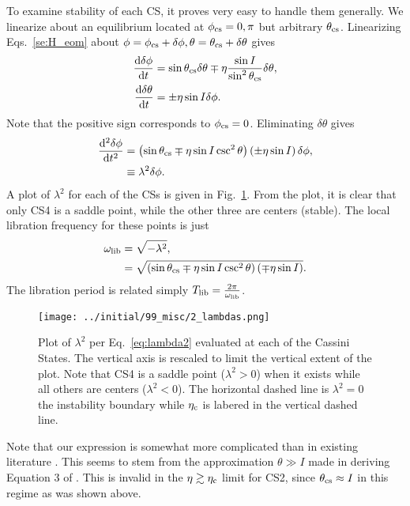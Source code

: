 \documentclass[
        fleqn,
        usenatbib,
        referee,
    ]{mnras}
\newcommand*{\rd}[2]{\frac{\mathrm{d}#1}{\mathrm{d}#2}}
\newcommand*{\rtd}[2]{\frac{\mathrm{d}^2#1}{\mathrm{d}#2^2}}
\newcommand*{\p}[1]{\left(#1\right)}
\begin{document}
To examine stability of each CS, it proves very easy to handle them generally.
We linearize about an equilibrium located at $\phi_{\rm cs} = 0, \pi$ but
arbitrary $\theta_{\rm cs}$. Linearizing Eqs.~\eqref{se:H_eom} about $\phi =
\phi_{\rm cs} + \delta \phi, \theta = \theta_{\rm cs} + \delta \theta$ gives
\begin{subequations}\label{se:H_eom_lin}
    \begin{align}
        \rd{\delta \phi}{t} &= \sin \theta_{\rm cs} \delta \theta
            \mp \eta \frac{\sin I}{\sin^2\theta_{\rm cs}} \delta \theta,\\
        \rd{\delta \theta}{t} &= \pm \eta \sin I \delta \phi.
    \end{align}
\end{subequations}
Note that the positive sign corresponds to $\phi_{\rm cs} = 0$. Eliminating
$\delta \theta$ gives
\begin{align}
    \rtd{\delta \phi}{t} &= \p{\sin \theta_{\rm cs}
        \mp \eta \sin I\csc^2\theta}\p{\pm \eta \sin I} \delta
            \phi,\\
        &\equiv \lambda^2\delta \phi.\label{eq:lambda2}
\end{align}
A plot of $\lambda^2$ for each of the CSs is given in Fig.~\ref{fig:lambda2}.
From the plot, it is clear that only CS4 is a saddle point, while the other
three are centers (stable). The local libration frequency for these points is
just
\begin{align}
    \omega_{\rm lib} &= \sqrt{-\lambda^2},\\
        &= \sqrt{\p{\sin \theta_{\rm cs}
            \mp \eta \sin I \csc^2\theta}\p{\mp \eta \sin I}}.
\end{align}
The libration period is related simply $T_{\rm lib} = \frac{2\pi}{\omega_{\rm
lib}}$.
\begin{figure}[t]
    \centering
    \texttt{[image: ../initial/99\_misc/2\_lambdas.png]}
    \caption{Plot of $\lambda^2$ per Eq.~\eqref{eq:lambda2} evaluated at each
    of the Cassini States. The vertical axis is rescaled to limit the vertical
    extent of the plot. Note that CS4 is a saddle point ($\lambda^2 > 0$) when
    it exists while all others are centers ($\lambda^2 < 0$). The horizontal
    dashed line is $\lambda^2 = 0$ the instability boundary while $\eta_{\rm c}$ is
    labered in the vertical dashed line.}\label{fig:lambda2}
\end{figure}

Note that our expression is somewhat more complicated than in existing
literature \citep{millholland_disk,ward2004II}. This seems to stem from the
approximation $\theta \gg I$ made in deriving Equation 3 of
\citet{ward2004II}. This is invalid in the $\eta \gtrsim \eta_{\rm c}$ limit for
CS2, since $\theta_{\rm cs} \approx I$ in this regime as was shown above.
\end{document}
